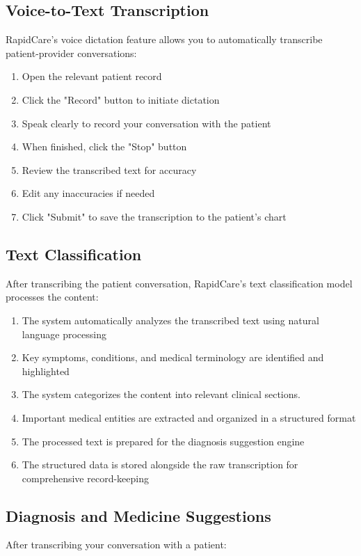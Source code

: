 \documentclass[12pt, titlepage]{article}
\begin{document}
\subsection{Voice-to-Text Transcription}
RapidCare's voice dictation feature allows you to automatically transcribe patient-provider conversations:

\begin{enumerate}
\item Open the relevant patient record
\item Click the "Record" button to initiate dictation
\item Speak clearly to record your conversation with the patient
\item When finished, click the "Stop" button
\item Review the transcribed text for accuracy
\item Edit any inaccuracies if needed
\item Click "Submit" to save the transcription to the patient's chart
\end{enumerate}

\subsection{Text Classification}
After transcribing the patient conversation, RapidCare's text classification model processes the content:
\begin{enumerate}
\item The system automatically analyzes the transcribed text using natural language processing
\item Key symptoms, conditions, and medical terminology are identified and highlighted
\item The system categorizes the content into relevant clinical sections.
\item Important medical entities are extracted and organized in a structured format
\item The processed text is prepared for the diagnosis suggestion engine
\item The structured data is stored alongside the raw transcription for comprehensive record-keeping
\end{enumerate}

\subsection{Diagnosis and Medicine Suggestions}
After transcribing your conversation with a patient:
\end{document}
